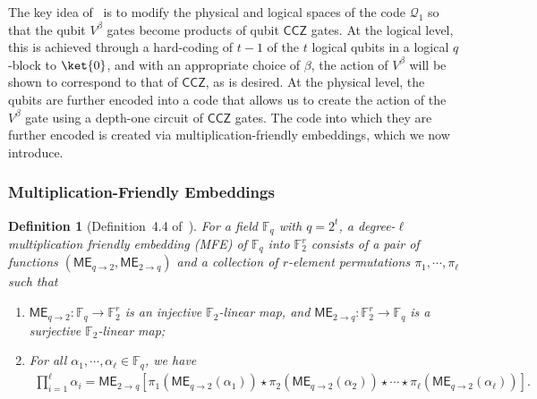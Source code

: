 \documentclass[11pt]{article}
\newtheorem{definition}[theorem]{Definition}
\theoremstyle{definition}
\newcommand{\CCZ}{\mathsf{CCZ}}
\newcommand{\al}{\alpha}
\newcommand{\qcode}{\mathcal{Q}}
\newcommand{\FF}{\mathbb{F}}
\newcommand{\ME}{\mathsf{ME}_{q\rightarrow 2}}
\newcommand{\MEinv}{\mathsf{ME}_{2 \rightarrow q}}
\begin{document}
The key idea of~\cite{nguyen2024goodbinaryquantumcodes} is to modify the physical and logical spaces of the code $\qcode_1$ so that the qubit $V^\beta$ gates become products of qubit $\CCZ$ gates. At the logical level, this is achieved through a hard-coding of $t-1$ of the $t$ logical qubits in a logical $q$-block to $\ket{0}$, and with an appropriate choice of $\beta$, the action of $V^\beta$ will be shown to correspond to that of $\CCZ$, as is desired. At the physical level, the qubits are further encoded into a code that allows us to create the action of the $V^\beta$ gate using a depth-one circuit of $\CCZ$ gates. The code into which they are further encoded is created via multiplication-friendly embeddings, which we now introduce.




\subsubsection{Multiplication-Friendly Embeddings}

\begin{definition}[Definition~4.4 of~\cite{nguyen2024goodbinaryquantumcodes}]\label{def:MFE}
    For a field $\FF_q$ with $q = 2^t$, a degree-$\ell$ multiplication friendly embedding (MFE) of $\FF_q$ 
    into $\FF_2^r$ consists of a pair of functions $(\ME, \MEinv)$ and a collection of $r$-element permutations $\pi_1, \cdots, \pi_\ell$ such that
    \begin{enumerate}[itemsep = 0pt]
        \item $\ME: \FF_q\rightarrow \FF_2^r$ is an injective $\FF_2$-linear map, and $\MEinv: \FF_2^r\rightarrow \FF_q$ is a surjective $\FF_2$-linear map;
        \item For all $\al_1, \cdots, \al_\ell\in \FF_q$, we have     \begin{align}\label{eq:multiplication_friendly_encoding}
            \prod_{i=1}^\ell \al_i = \MEinv\left[ \pi_1(\ME(\al_1)) \star \pi_2(\ME(\al_2)) \star \cdots
            \star \pi_\ell(\ME(\al_\ell)) \right].
        \end{align}
    \end{enumerate}
\end{definition}
\end{document}
